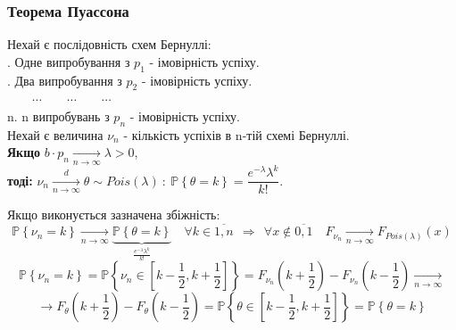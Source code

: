 \subsubsection{Теорема Пуассона}
\begin{boxteo} [Пуассона]
Нехай є послідовність схем Бернуллі:\\
. Одне випробування з $p_1$ - імовірність успіху.\\
. Два випробування з $p_2$ - імовірність успіху.\\
$\qquad \cdots \qquad \cdots \qquad \cdots$\\
\quad n. n випробувань з $p_n$ - імовірність успіху.\\
Нехай є величина $\nu_n$ - кількість успіхів в n-тій схемі Бернуллі.\\
\textbf{Якщо} $b\cdot p_n \xrightarrow[n\to\infty]{} \lambda > 0$,\\
\textbf{тоді:} $\nu_n \xrightarrow[n\to\infty]{d} \theta \sim Pois(\lambda) \ : \  \mathbb{P} \left\lbrace \theta = k \right\rbrace = \dfrac{e^{-\lambda} \lambda^k}{k!} $.
\end{boxteo}
\begin{remark} Якщо виконується зазначена збіжність:
$$
\mathbb{P} \left\lbrace \nu_n = k \right\rbrace \xrightarrow[n\to\infty]{} \underbrace{\mathbb{P} \left\lbrace \theta = k \right\rbrace}_{\frac{e^{-\lambda} \lambda^k}{k!} } \quad \forall k \in \overline{1,n}
\ \ \Longrightarrow \ \
\forall x \notin \overline{0,1}  \quad F_{\nu_n} \xrightarrow[n\to\infty]{} F_{Pois(\lambda)} (x)
$$
$$
\mathbb{P} \left\lbrace \nu_n = k \right\rbrace = \mathbb{P} \left\lbrace \nu_n \in \left[ k- \frac{1}{2}, k+ \frac{1}{2} \right]   \right\rbrace = F_{\nu_n} \left( k + \frac{1}{2}  \right) - F_{\nu_n} \left( k - \frac{1}{2}  \right) \xrightarrow[n\to\infty]{}
$$
$$
\longrightarrow F_{\theta} \left( k + \frac{1}{2}  \right) - F_{\theta} \left( k - \frac{1}{2}  \right) = \mathbb{P} \left\lbrace \theta \in \left[ k- \frac{1}{2}, k+ \frac{1}{2}  \right] \right\rbrace = \mathbb{P} \left\lbrace \theta = k \right\rbrace
$$
\end{remark}
